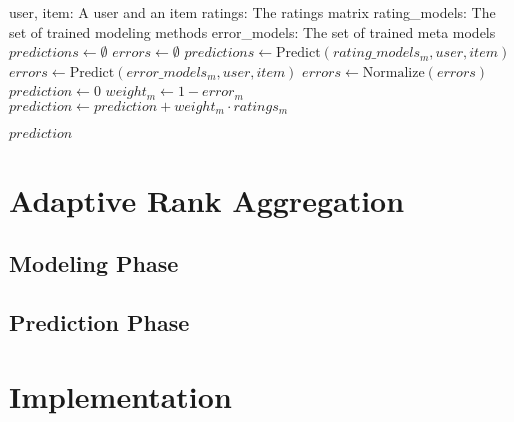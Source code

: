 \begin{algorithm}
  \begin{algorithmic}[1]
  \REQUIRE user, item: A user and an item
  \REQUIRE ratings: The ratings matrix
  \REQUIRE rating\_models: The set of trained modeling methods 
  \REQUIRE error\_models: The set of trained meta models
  \ENSURE
    \STATE $predictions \gets \emptyset$
    \STATE $errors  \gets \emptyset$
      \STATE $predictions \gets \mathrm{Predict}(rating\_models_m, user, item)$
      \STATE $errors  \gets \mathrm{Predict}(error\_models_m, user, item)$
    \ENDFOR 
    \STATE $errors \gets \mathrm{Normalize}(errors)$
    \STATE $prediction \gets 0$
      \STATE $weight_m \gets 1 - error_m$
      \STATE $prediction \gets prediction + weight_m \cdot ratings_m$
    \ENDFOR
 
  \RETURN $prediction$
  \end{algorithmic}
  \caption[Prediction]{Prediction
  }
  \label{code:prediction}
\end{algorithm}




\section{Adaptive Rank Aggregation}
\label{sec:methods:rank}

\subsection{Modeling Phase}

\subsection{Prediction Phase}

\section{Implementation}
